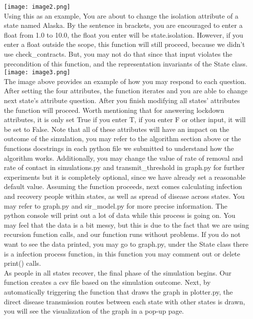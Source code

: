 \documentclass[12pt]{article}
\begin{document}
\texttt{[image: image2.png]}\\
Using this as an example, You are about to change the isolation attribute of a state named Alaska. By the sentence in brackets, you are encouraged to enter a float from 1.0 to 10.0, the float you enter will be state.isolation. However, if you enter a float outside the scope, this function will still proceed, because we didn't use check\_contracts. But, you may not do that since that input violates the precondition of this function, and the representation invariants of the State class.\\
\texttt{[image: image3.png]}\\
The image above provides an example of how you may respond to each question. After setting the four attributes, the function iterates and you are able to change next state's attribute question. After you finish modifying all states' attributes the function will proceed. Worth mentioning that for answering lockdown attributes, it is only set True if you enter T, if you enter F or other input, it will be set to False. Note that all of these attributes will have an impact on the outcome of the simulation, you may refer to the algorithm section above or the functions docstrings in each python file we submitted to understand how the algorithm works. Additionally, you may change the value of rate of removal and rate of contact in simulations.py and transmit\_threshold in graph.py for further experiments but it is completely optional, since we have already set a reasonable default value.
Assuming the function proceeds, next comes calculating infection and recovery people within states, as well as spread of disease across states. You may refer to graph.py and sir\_model.py for more precise information. The python console will print out a lot of data while this process is going on. You may feel that the data is a bit messy, but this is due to the fact that we are using recursion function calls, and our function runs without problems. If you do not want to see the data printed, you may go to graph.py, under the State class there is a infection process function, in this function you may comment out or delete print() calls.\\
As people in all states recover, the final phase of the simulation begins. Our function creates a csv file based on the simulation outcome. Next, by automatically triggering the function that draws the graph in plotter.py, the direct disease transmission routes between each state with other states is drawn, you will see the visualization of the graph in a pop-up page.\\
\end{document}
